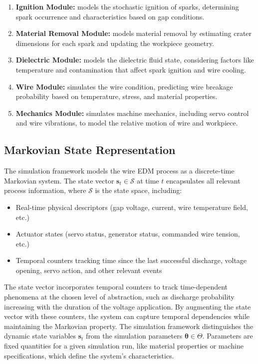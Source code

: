 \documentclass[5p,times,procedia]{elsarticle}
\begin{document}
\begin{enumerate}
    \item \textbf{Ignition Module:} models the stochastic ignition of sparks, determining spark occurrence and characteristics based on gap conditions.

    \item \textbf{Material Removal Module:} models material removal by estimating crater dimensions for each spark and updating the workpiece geometry.

    \item \textbf{Dielectric Module:} models the dielectric fluid state, considering factors like temperature and contamination that affect spark ignition and wire cooling.
    
    \item \textbf{Wire Module:} simulates the wire condition, predicting wire breakage probability based on temperature, stress, and material properties.

    \item \textbf{Mechanics Module:} simulates machine mechanics, including servo control and wire vibrations, to model the relative motion of wire and workpiece.

\end{enumerate}

\subsection{Markovian State Representation}

The simulation framework models the wire EDM process as a discrete-time Markovian system. The state vector $\mathbf{s}_t \in \mathcal{S}$ at time $t$ encapsulates all relevant process information, where $\mathcal{S}$ is the state space, including:
\begin{itemize}
    \item Real-time physical descriptors (gap voltage, current, wire temperature field, etc.)
    \item Actuator states (servo status, generator status, commanded wire tension, etc.)
    \item Temporal counters tracking time since the last successful discharge, voltage opening, servo action, and other relevant events
\end{itemize}
The state vector incorporates temporal counters to track time-dependent phenomena at the chosen level of abstraction, such as discharge probability increasing with the duration of the voltage application. By augmenting the state vector with these counters, the system can capture temporal dependencies while maintaining the Markovian property. The simulation framework distinguishes the dynamic state variables $\mathbf{s}_t$ from the simulation parameters $\boldsymbol{\theta} \in \Theta$. Parameters are fixed quantities for a given simulation run, like material properties or machine specifications, which define the system's characteristics.
\end{document}
